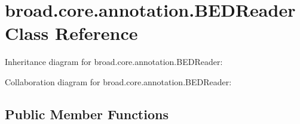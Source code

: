 \hypertarget{classbroad_1_1core_1_1annotation_1_1_b_e_d_reader}{\section{broad.\+core.\+annotation.\+B\+E\+D\+Reader Class Reference}
\label{classbroad_1_1core_1_1annotation_1_1_b_e_d_reader}
}


Inheritance diagram for broad.\+core.\+annotation.\+B\+E\+D\+Reader\+:


Collaboration diagram for broad.\+core.\+annotation.\+B\+E\+D\+Reader\+:
\subsection*{Public Member Functions}
